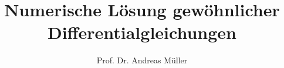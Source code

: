 %
%
%


\beamertemplatenavigationsymbolsempty
\title[DGL]{Numerische Lösung gewöhnlicher Differentialgleichungen}
\author[A.~Müller]{Prof. Dr. Andreas Müller}
\date[]{}

